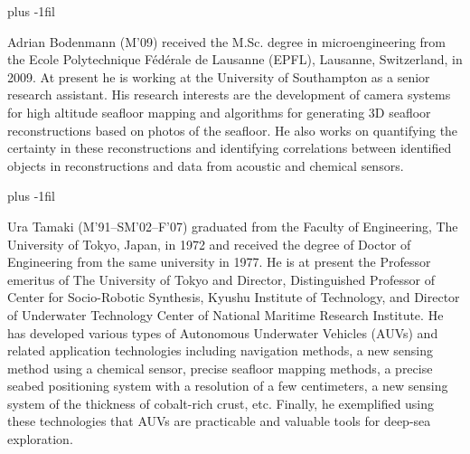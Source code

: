 \vskip 0pt plus -1fil

\begin{IEEEbiography}{Adrian Bodenmann}
(M’09) received the M.Sc. degree in microengineering from the Ecole Polytechnique Fédérale de Lausanne (EPFL), Lausanne, Switzerland, in 2009. At present he is working at the University of Southampton as a senior research assistant. His research interests are the development of camera systems for high altitude seafloor mapping and algorithms for generating 3D seafloor reconstructions based on photos of the seafloor. He also works on quantifying the certainty in these reconstructions and identifying correlations between identified objects in reconstructions and data from acoustic and chemical sensors.
\end{IEEEbiography}

\vskip 0pt plus -1fil

\begin{IEEEbiography}{Ura Tamaki}
(M’91–SM’02–F’07) graduated from the Faculty of Engineering, The University of Tokyo, Japan, in 1972 and received the degree of Doctor of Engineering from the same university in 1977. He is at present the Professor emeritus of The University of Tokyo and  Director, Distinguished Professor of Center for Socio-Robotic Synthesis, Kyushu Institute of Technology, and Director of Underwater Technology Center of National Maritime Research Institute. He has developed various types of Autonomous Underwater Vehicles (AUVs) and related application technologies including navigation methods, a new sensing method using a chemical sensor, precise seafloor mapping methods, a precise seabed positioning system with a resolution of a few centimeters, a new sensing system of the thickness of cobalt-rich crust, etc. Finally, he exemplified using these technologies that AUVs are practicable and valuable tools for deep-sea exploration.
\end{IEEEbiography}